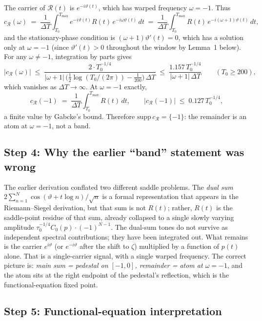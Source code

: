 \documentclass[11pt]{article}
\begin{document}
The carrier of $\mathcal R(t)$ is $e^{-i\vartheta(t)}$, which has warped frequency $\omega=-1$. Thus
\[
  c_{\mathcal R}(\omega)
  \;=\; \frac{1}{\Delta T}\int_{T_{0}}^{T_{\max}} e^{-i\vartheta(t)}R(t)\,e^{-i\omega\vartheta(t)}\,dt
  \;=\; \frac{1}{\Delta T}\int_{T_{0}}^{T_{\max}} R(t)\,e^{-i(\omega+1)\vartheta(t)}\,dt,
\]
and the stationary-phase condition is $(\omega+1)\vartheta'(t)=0$, which has a solution only at $\omega=-1$ (since $\vartheta'(t)>0$ throughout the window by Lemma~1 below). For any $\omega\ne -1$, integration by parts gives
\[
  |c_{\mathcal R}(\omega)|
  \;\le\; \frac{2\cdot T_{0}^{-1/4}}{|\omega+1|\,\bigl(\tfrac12\log(T_{0}/(2\pi))-\tfrac{1}{200}\bigr)\,\Delta T}
  \;\le\; \frac{1.157\,T_{0}^{-1/4}}{|\omega+1|\,\Delta T}\qquad(T_{0}\ge 200),
\]
which vanishes as $\Delta T\to\infty$. At $\omega=-1$ exactly,
\[
  c_{\mathcal R}(-1)
  \;=\; \frac{1}{\Delta T}\int_{T_{0}}^{T_{\max}} R(t)\,dt,
  \qquad
  |c_{\mathcal R}(-1)|\;\le\;0.127\,T_{0}^{-1/4},
\]
a finite value by Gabcke's bound. Therefore $\mathrm{supp}\,c_{\mathcal R}=\{-1\}$: the remainder is an atom at $\omega=-1$, not a band.

\subsection*{Step 4: Why the earlier ``band'' statement was wrong}

The earlier derivation conflated two different saddle problems. The \emph{dual sum} $2\sum_{n=1}^{N}\cos(\vartheta+t\log n)/\sqrt n$ is a formal representation that appears in the Riemann--Siegel derivation, but that sum is not $R(t)$; rather, $R(t)$ is the saddle-point residue of that sum, already collapsed to a single slowly varying amplitude $\tau_{0}^{-1/4}C_{0}(p)\cdot(-1)^{N-1}$. The dual-sum tones do not survive as independent spectral contributions; they have been integrated out. What remains is the carrier $e^{i\vartheta}$ (or $e^{-i\vartheta}$ after the shift to $\zeta$) multiplied by a function of $p(t)$ alone. That is a single-carrier signal, with a single warped frequency. The correct picture is: \emph{main sum = pedestal on $[-1,0]$, remainder = atom at $\omega=-1$}, and the atom sits at the right endpoint of the pedestal's reflection, which is the functional-equation fixed point.

\subsection*{Step 5: Functional-equation interpretation}
\end{document}
